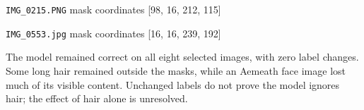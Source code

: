 \documentclass[11pt]{article}
\begin{document}
\par\noindent\begin{minipage}{\linewidth}
\texttt{IMG\_0215.PNG} mask coordinates [98, 16, 212, 115]
\end{minipage}\par\medskip
\par\noindent\begin{minipage}{\linewidth}
\texttt{IMG\_0553.jpg} mask coordinates [16, 16, 239, 192]
\end{minipage}\par\medskip
The model remained correct on all eight selected images, with zero label changes. Some long hair remained outside the masks, while an Aemeath face image lost much of its visible content. Unchanged labels do not prove the model ignores hair; the effect of hair alone is unresolved.
\clearpage
\end{document}
